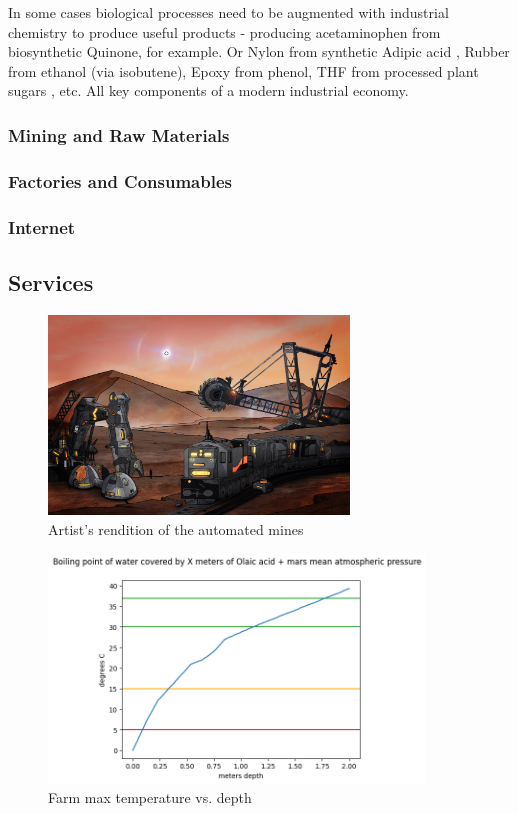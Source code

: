 \documentclass[fleqn,10pt]{Stylesheet} %
\begin{document}
In some cases biological processes need to be augmented with industrial chemistry to produce useful products - producing acetaminophen from biosynthetic Quinone, for example. Or Nylon from synthetic Adipic acid \cite{WeiNiu2002}, Rubber from ethanol \cite{JunmingSun2011} (via isobutene), Epoxy from phenol, THF from processed plant sugars \cite{ShuoChen2018}, etc. All key components of a modern industrial economy.


\subsubsection{Mining and Raw Materials}
\label{sec:necessities_raw}

\subsubsection{Factories and Consumables}
\label{sec:necessities_consumable}

\subsubsection{Internet}
\label{sec:necessities_internet}

\subsection{Services}


\begin{figure}
    \centering
    \includegraphics[width=80mm]{art/mining.jpg}
    \caption{Artist's rendition of the automated mines}
    \label{fig:mines}
\end{figure}

\begin{figure}
    \centering
    \includegraphics[width=100mm]{figures/fig_bp.png}
    \caption{Farm max temperature vs. depth}
    \label{fig:farm}
\end{figure}
\end{document}
